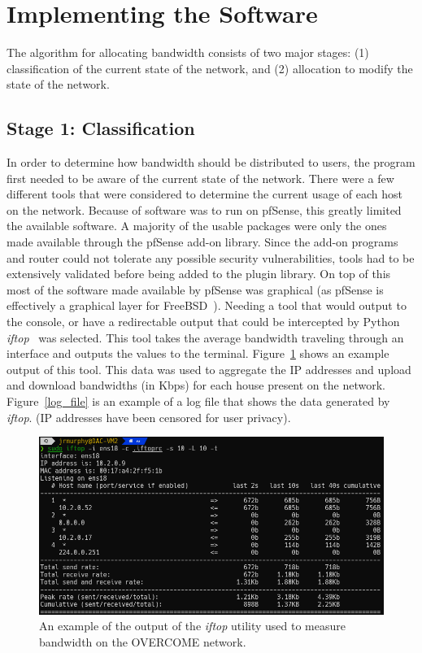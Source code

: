 \section{Implementing the Software}
The algorithm for allocating bandwidth consists of two major stages: (1) classification of the current state of the network, and (2) allocation to modify the state of the network.

\subsection{Stage 1: Classification}
In order to determine how bandwidth should be distributed to users, the program first needed to be aware of the current state of the network.
There were a few different tools that were considered to determine the current usage of each host on the network.
Because of software was to run on pfSense, this greatly limited the available software.
A majority of the usable packages were only the ones made available through the pfSense add-on library.
Since the add-on programs and router could not tolerate any possible security vulnerabilities, tools had to be extensively validated before being added to the plugin library.
On top of this most of the software made available by pfSense was graphical (as pfSense is effectively a graphical layer for FreeBSD~\cite{freebsd}).
Needing a tool that would output to the console, or have a redirectable output that could be intercepted by Python \textit{iftop}~\cite{iftop} was selected.
This tool takes the average bandwidth traveling through an interface and outputs the values to the terminal.
Figure~\ref{iftop_out} shows an example output of this tool.
This data was used to aggregate the IP addresses and upload and download bandwidths (in Kbps) for each house present on the network.
Figure~\ref{log_file} is an example of a log file that shows the data generated by \textit{iftop}. (IP addresses have been censored for user privacy).\par
\begin{figure}[!ht]
    \centering
    \includegraphics[width=\textwidth,keepaspectratio]{Images/Chpt4/iftop_util.png}
    \caption{An example of the output of the \textit{iftop} utility used to measure bandwidth on the OVERCOME network.}
    \label{iftop_out}
\end{figure}
